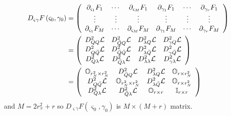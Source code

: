 \documentclass[aps,preprint]{revtex4}%
\begin{document}
\begin{align}
D_{\varsigma\gamma}F\left(  \varsigma_{0},\gamma_{0}\right)   &  =\left(
\begin{array}
[c]{cccccc}%
\partial_{\varsigma_{1}}F_{1} & \cdots & \partial_{\varsigma_{M}}F_{1} &
\partial_{\gamma_{1}}F_{1} & \cdots & \partial_{\gamma_{r}}F_{1}\\
\vdots & \vdots & \vdots & \vdots & \vdots & \vdots\\
\partial_{\varsigma_{1}}F_{M} & \cdots & \partial_{\varsigma_{M}}F_{M} &
\partial_{\gamma_{1}}F_{M} & \cdots & \partial_{\gamma_{r}}F_{M}%
\end{array}
\right) \nonumber\\
&  =\left(
\begin{array}
[c]{cccc}%
D_{QQ}^{2}\mathcal{L} & D_{\bar{Q}Q}^{2}\mathcal{L} & D_{\lambda Q}%
^{2}\mathcal{L} & D_{\gamma Q}^{2}\mathcal{L}\\
D_{Q\bar{Q}}^{2}\mathcal{L} & D_{\bar{Q}\bar{Q}}^{2}\mathcal{L} &
D_{\lambda\bar{Q}}^{2}\mathcal{L} & D_{\gamma\bar{Q}}^{2}\mathcal{L}\\
D_{Q\lambda}^{2}\mathcal{L} & D_{\bar{Q}\lambda}^{2}\mathcal{L} &
D_{\lambda\lambda}^{2}\mathcal{L} & D_{\gamma\lambda}^{2}\mathcal{L}%
\end{array}
\right) \nonumber\\
&  =\left(
\begin{array}
[c]{cccc}%
\mathbb{O}_{r_{N}^{2}\times r_{N}^{2}} & D_{\bar{Q}Q}^{2}\mathcal{L} &
D_{\lambda Q}^{2}\mathcal{L} & \mathbb{O}_{r\times r_{N}^{2}}\\
D_{Q\bar{Q}}^{2}\mathcal{L} & \mathbb{O}_{r_{N}^{2}\times r_{N}^{2}} &
D_{\lambda\bar{Q}}^{2}\mathcal{L} & \mathbb{O}_{r\times r_{N}^{2}}\\
D_{Q\lambda}^{2}\mathcal{L} & D_{\bar{Q}\lambda}^{2}\mathcal{L} &
\mathbb{O}_{r\times r} & \mathbb{I}_{r\times r}%
\end{array}
\right)
\end{align}
and $M=2r_{^{N}}^{2}+r$ so $D_{\varsigma\gamma}F\left(  \varsigma_{0}%
,\gamma_{0}\right)  $ is $M\times\left(  M+r\right)  $ matrix.
\end{document}

